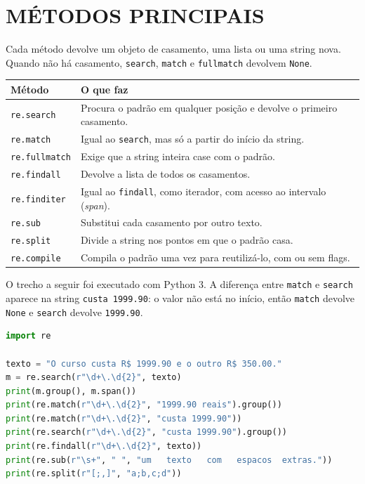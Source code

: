 \documentclass[
    12pt,
    oneside,
    a4paper,
    chapter=TITLE,
    section=TITLE,
    sumario=abnt-6027-2012
]{abntex2}
\begin{document}
\section{MÉTODOS PRINCIPAIS}
\label{sec:metodos}

Cada método devolve um objeto de casamento, uma lista ou uma string nova. Quando não há casamento, \texttt{search}, \texttt{match} e \texttt{fullmatch} devolvem \texttt{None}.

\begin{quadro}[!h]
    \centering
    \small
    \begin{tabular}{|p{3.2cm}|p{10.8cm}|}
        \hline
        \textbf{Método} & \textbf{O que faz} \\
        \hline
        \hline
        \texttt{re.search} & Procura o padrão em qualquer posição e devolve o primeiro casamento. \\
        \hline
        \texttt{re.match} & Igual ao \texttt{search}, mas só a partir do início da string. \\
        \hline
        \texttt{re.fullmatch} & Exige que a string inteira case com o padrão. \\
        \hline
        \texttt{re.findall} & Devolve a lista de todos os casamentos. \\
        \hline
        \texttt{re.finditer} & Igual ao \texttt{findall}, como iterador, com acesso ao intervalo (\textit{span}). \\
        \hline
        \texttt{re.sub} & Substitui cada casamento por outro texto. \\
        \hline
        \texttt{re.split} & Divide a string nos pontos em que o padrão casa. \\
        \hline
        \texttt{re.compile} & Compila o padrão uma vez para reutilizá-lo, com ou sem flags. \\
        \hline
    \end{tabular}
\end{quadro}

O trecho a seguir foi executado com Python 3. A diferença entre \texttt{match} e \texttt{search} aparece na string \texttt{custa 1999.90}: o valor não está no início, então \texttt{match} devolve \texttt{None} e \texttt{search} devolve \texttt{1999.90}.

\begin{lstlisting}[language=Python]
import re

texto = "O curso custa R$ 1999.90 e o outro R$ 350.00."
m = re.search(r"\d+\.\d{2}", texto)
print(m.group(), m.span())
print(re.match(r"\d+\.\d{2}", "1999.90 reais").group())
print(re.match(r"\d+\.\d{2}", "custa 1999.90"))
print(re.search(r"\d+\.\d{2}", "custa 1999.90").group())
print(re.findall(r"\d+\.\d{2}", texto))
print(re.sub(r"\s+", " ", "um   texto   com   espacos  extras."))
print(re.split(r"[;,]", "a;b,c;d"))
\end{lstlisting}
\end{document}
